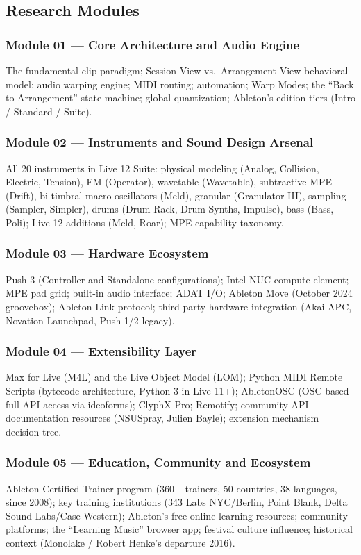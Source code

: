 \documentclass[11pt,letterpaper]{article}
\begin{document}
\subsection{Research Modules}

\subsubsection{Module 01 --- Core Architecture and Audio Engine}
The fundamental clip paradigm; Session View vs.\ Arrangement View behavioral model;
audio warping engine; MIDI routing; automation; Warp Modes; the ``Back to Arrangement''
state machine; global quantization; Ableton's edition tiers (Intro / Standard / Suite).

\subsubsection{Module 02 --- Instruments and Sound Design Arsenal}
All 20 instruments in Live 12 Suite: physical modeling (Analog, Collision, Electric, Tension),
FM (Operator), wavetable (Wavetable), subtractive MPE (Drift), bi-timbral macro oscillators
(Meld), granular (Granulator III), sampling (Sampler, Simpler), drums (Drum Rack, Drum Synths,
Impulse), bass (Bass, Poli); Live 12 additions (Meld, Roar); MPE capability taxonomy.

\subsubsection{Module 03 --- Hardware Ecosystem}
Push 3 (Controller and Standalone configurations); Intel NUC compute element; MPE pad grid;
built-in audio interface; ADAT I/O; Ableton Move (October 2024 groovebox); Ableton Link
protocol; third-party hardware integration (Akai APC, Novation Launchpad, Push 1/2 legacy).

\subsubsection{Module 04 --- Extensibility Layer}
Max for Live (M4L) and the Live Object Model (LOM); Python MIDI Remote Scripts (bytecode
architecture, Python 3 in Live 11+); AbletonOSC (OSC-based full API access via ideoforms);
ClyphX Pro; Remotify; community API documentation resources (NSUSpray, Julien Bayle);
extension mechanism decision tree.

\subsubsection{Module 05 --- Education, Community and Ecosystem}
Ableton Certified Trainer program (360+ trainers, 50 countries, 38 languages, since 2008);
key training institutions (343 Labs NYC/Berlin, Point Blank, Delta Sound Labs/Case Western);
Ableton's free online learning resources; community platforms; the ``Learning Music'' browser
app; festival culture influence; historical context (Monolake / Robert Henke's departure 2016).
\end{document}
